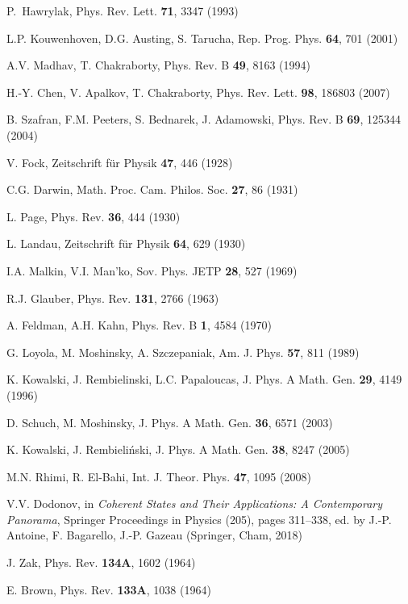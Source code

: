 \documentclass[aps,showpacs,showkeys]{revtex4}
\begin{document}
\begin{thebibliography}{10}

P.~Hawrylak, Phys. Rev. Lett. {\bf 71}, 3347 (1993)

L.P. Kouwenhoven, D.G. Austing,  S. Tarucha, Rep. Prog.  Phys. {\bf 64}, 701 (2001)

A.V. Madhav, T. Chakraborty, Phys. Rev. B {\bf 49}, 8163 (1994)

H.-Y. Chen, V. Apalkov,  T. Chakraborty, Phys. Rev. Lett. {\bf 98}, 186803 (2007)

B. Szafran, F.M. Peeters, S. Bednarek,  J. Adamowski, Phys. Rev. B {\bf 69}, 125344 (2004)

V. Fock,  Zeitschrift f{\"u}r Physik {\bf 47}, 446 (1928)

C.G. Darwin,  Math. Proc. Cam. Philos.  Soc. {\bf 27}, 86 (1931)

L. Page,  Phys. Rev. {\bf 36}, 444 (1930)

L. Landau, Zeitschrift f{\"u}r Physik {\bf 64}, 629 (1930)

I.A. Malkin, V.I. Man'ko,  Sov. Phys. JETP {\bf 28}, 527 (1969)

R.J. Glauber, Phys. Rev. {\bf 131}, 2766 (1963)

A. Feldman,  A.H. Kahn,  Phys. Rev. B {\bf 1}, 4584 (1970)

G. Loyola, M. Moshinsky,  A. Szczepaniak, Am. J. Phys. {\bf 57}, 811 (1989)

K. Kowalski, J. Rembielinski, L.C. Papaloucas, J. Phys. A Math. Gen. {\bf 29}, 4149 (1996)

D. Schuch, M. Moshinsky, J. Phys. A Math. Gen. {\bf 36}, 6571 (2003)

K. Kowalski, J. Rembieli{\'{n}}ski, J. Phys. A Math. Gen. {\bf 38}, 8247 (2005)

M.N. Rhimi, R. El-Bahi, Int. J. Theor. Phys. {\bf 47}, 1095 (2008)

V.V. Dodonov, in {\em Coherent States and Their Applications: A Contemporary Panorama}, Springer Proceedings in Physics (205), pages 311--338, ed. by  J.-P. Antoine, F. Bagarello, J.-P. Gazeau (Springer, Cham, 2018)

J. Zak,  Phys. Rev. {\bf 134A}, 1602 (1964)

E. Brown,  Phys. Rev. {\bf 133A}, 1038 (1964)


\end{thebibliography}
\end{document}
